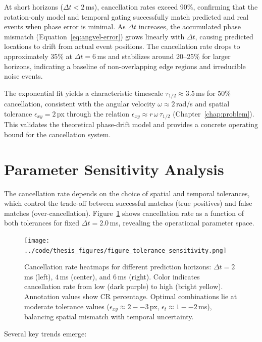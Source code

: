 At short horizons ($\Delta t < 2$\,ms), cancellation rates exceed 90\%, confirming that the rotation-only model and temporal gating successfully match predicted and real events when phase error is minimal. As $\Delta t$ increases, the accumulated phase mismatch (Equation~\eqref{eq:angvel-error}) grows linearly with $\Delta t$, causing predicted locations to drift from actual event positions. The cancellation rate drops to approximately 35\% at $\Delta t=6$\,ms and stabilizes around 20--25\% for larger horizons, indicating a baseline of non-overlapping edge regions and irreducible noise events.

The exponential fit yields a characteristic timescale $\tau_{1/2} \approx 3.5$\,ms for 50\% cancellation, consistent with the angular velocity $\omega \approx 2$\,rad/s and spatial tolerance $\epsilon_{xy}=2$\,px through the relation $\epsilon_{xy} \approx r\,\omega\,\tau_{1/2}$ (Chapter~\ref{chap:problem}). This validates the theoretical phase-drift model and provides a concrete operating bound for the cancellation system.

\section{Parameter Sensitivity Analysis}

The cancellation rate depends on the choice of spatial and temporal tolerances, which control the trade-off between successful matches (true positives) and false matches (over-cancellation). Figure~\ref{fig:tolerance_heatmap} shows cancellation rate as a function of both tolerances for fixed $\Delta t=2.0$\,ms, revealing the operational parameter space.

\begin{figure}[t]
  \centering
  \texttt{[image: ../code/thesis\_figures/figure\_tolerance\_sensitivity.png]}
  \caption{Cancellation rate heatmaps for different prediction horizons: $\Delta t = 2$\,ms (left), $4$\,ms (center), and $6$\,ms (right). Color indicates cancellation rate from low (dark purple) to high (bright yellow). Annotation values show CR percentage. Optimal combinations lie at moderate tolerance values ($\epsilon_{xy} \approx 2--3$\,px, $\epsilon_t \approx 1--2$\,ms), balancing spatial mismatch with temporal uncertainty.}
  \label{fig:tolerance_heatmap}
\end{figure}

Several key trends emerge:

